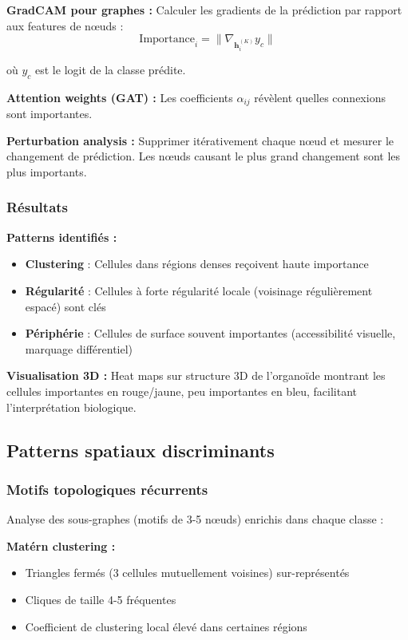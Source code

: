 \textbf{GradCAM pour graphes :}
Calculer les gradients de la prédiction par rapport aux features de nœuds :
\[
\text{Importance}_i = \|\nabla_{\mathbf{h}_i^{(K)}} y_c\|
\]

où $y_c$ est le logit de la classe prédite.

\textbf{Attention weights (GAT) :}
Les coefficients $\alpha_{ij}$ révèlent quelles connexions sont importantes.

\textbf{Perturbation analysis :}
Supprimer itérativement chaque nœud et mesurer le changement de prédiction. Les nœuds causant le plus grand changement sont les plus importants.

\subsubsection{Résultats}

\textbf{Patterns identifiés :}
\begin{itemize}
    \item \textbf{Clustering} : Cellules dans régions denses reçoivent haute importance
    \item \textbf{Régularité} : Cellules à forte régularité locale (voisinage régulièrement espacé) sont clés
    \item \textbf{Périphérie} : Cellules de surface souvent importantes (accessibilité visuelle, marquage différentiel)
\end{itemize}

\textbf{Visualisation 3D :}
Heat maps sur structure 3D de l'organoïde montrant les cellules importantes en rouge/jaune, peu importantes en bleu, facilitant l'interprétation biologique.

\subsection{Patterns spatiaux discriminants}

\subsubsection{Motifs topologiques récurrents}

Analyse des sous-graphes (motifs de 3-5 nœuds) enrichis dans chaque classe :

\textbf{Matérn clustering :}
\begin{itemize}
    \item Triangles fermés (3 cellules mutuellement voisines) sur-représentés
    \item Cliques de taille 4-5 fréquentes
    \item Coefficient de clustering local élevé dans certaines régions
\end{itemize}

